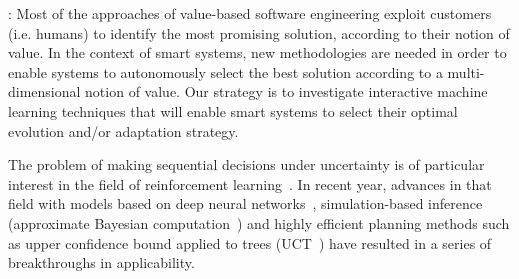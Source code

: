 \documentclass[12pt]{article}
\newcommand{\ugh}[1]{\textcolor{red}{\uwave{#1}}} %
\newcommand{\nb}[2]{
    \fcolorbox{gray}{yellow}{\bfseries\sffamily\scriptsize#1}
    {\sf\small$\blacktriangleright$\textit{#2}$\blacktriangleleft$}
   }
\newcommand{\ugh}[1]{#1} %
\newcommand{\nb}[2]{}
\newcommand\ivica[1]{\nb{Ivica}{#1}}
\begin{document}
:  
Most of the approaches of value-based software
engineering exploit customers (i.e. humans) to identify the most promising solution, according to their notion of value.
In the context of smart systems, new methodologies are needed in order to enable systems to autonomously select the best solution according to a multi-dimensional notion of value. Our strategy is
to investigate interactive machine learning techniques that will enable smart systems to select their optimal evolution and/or adaptation strategy.


The problem of making sequential decisions under uncertainty is of
particular interest in the field of reinforcement
learning~\cite{suba,BertsekasTsitsiklis:NDP}. In recent year, advances
in that field with models based on deep neural
networks~\cite{mnih2015human}, simulation-based inference (approximate
Bayesian computation~\cite{icml:abcrl}) and highly efficient planning
methods such as upper confidence bound applied to trees
(UCT~\cite{ECML:Kocsis+Szepesvari:2006}) have resulted in a series of
breakthroughs in applicability. %
\end{document}
